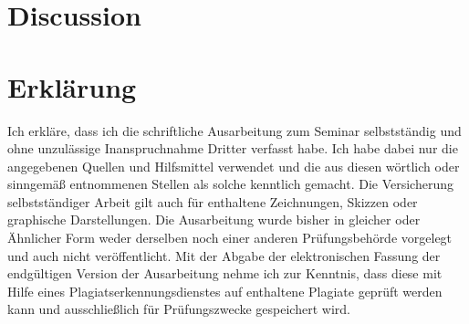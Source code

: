 \documentclass[english, 12pt]{scrartcl}
\theoremstyle{definition}
\theoremstyle{definition}
\theoremstyle{definition}
\begin{document}
\section{Discussion}
\newpage

\typeout{}



\newpage

\section*{Erklärung}
Ich erkläre, dass ich die schriftliche Ausarbeitung zum Seminar selbstständig und ohne unzulässige Inanspruchnahme Dritter verfasst habe. Ich habe dabei nur die angegebenen Quellen und Hilfsmittel verwendet und die aus diesen wörtlich oder sinngemäß entnommenen Stellen als solche kenntlich gemacht. Die Versicherung selbstständiger Arbeit gilt auch für enthaltene Zeichnungen, Skizzen oder graphische Darstellungen. Die Ausarbeitung wurde bisher in gleicher oder Ähnlicher Form weder derselben noch einer anderen Prüfungsbehörde vorgelegt und auch nicht veröffentlicht. Mit der Abgabe der elektronischen Fassung der endgültigen Version der Ausarbeitung nehme ich zur Kenntnis, dass diese mit Hilfe eines Plagiatserkennungsdienstes auf enthaltene Plagiate geprüft werden kann und ausschließlich für Prüfungszwecke gespeichert wird.
\end{document}
